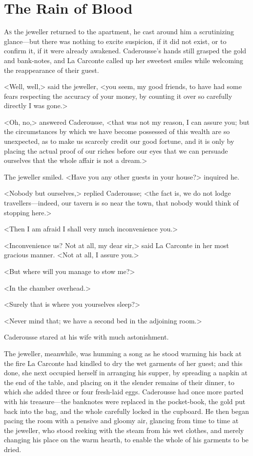 \chapter{The Rain of Blood} 

 \lettrine[ante=']{A}{s} the jeweller returned to the apartment, he cast around him a scrutinizing glance—but there was nothing to excite suspicion, if it did not exist, or to confirm it, if it were already awakened. Caderousse's hands still grasped the gold and bank-notes, and La Carconte called up her sweetest smiles while welcoming the reappearance of their guest. 

 <Well, well,> said the jeweller, <you seem, my good friends, to have had some fears respecting the accuracy of your money, by counting it over so carefully directly I was gone.> 

 <Oh, no,> answered Caderousse, <that was not my reason, I can assure you; but the circumstances by which we have become possessed of this wealth are so unexpected, as to make us scarcely credit our good fortune, and it is only by placing the actual proof of our riches before our eyes that we can persuade ourselves that the whole affair is not a dream.> 

 The jeweller smiled. <Have you any other guests in your house?> inquired he. 

 <Nobody but ourselves,> replied Caderousse; <the fact is, we do not lodge travellers—indeed, our tavern is so near the town, that nobody would think of stopping here.> 

 <Then I am afraid I shall very much inconvenience you.> 

 <Inconvenience us? Not at all, my dear sir,> said La Carconte in her most gracious manner. <Not at all, I assure you.> 

 <But where will you manage to stow me?> 

 <In the chamber overhead.> 

<Surely that is where you yourselves sleep?> 

 <Never mind that; we have a second bed in the adjoining room.> 

 Caderousse stared at his wife with much astonishment. 

 The jeweller, meanwhile, was humming a song as he stood warming his back at the fire La Carconte had kindled to dry the wet garments of her guest; and this done, she next occupied herself in arranging his supper, by spreading a napkin at the end of the table, and placing on it the slender remains of their dinner, to which she added three or four fresh-laid eggs. Caderousse had once more parted with his treasure—the banknotes were replaced in the pocket-book, the gold put back into the bag, and the whole carefully locked in the cupboard. He then began pacing the room with a pensive and gloomy air, glancing from time to time at the jeweller, who stood reeking with the steam from his wet clothes, and merely changing his place on the warm hearth, to enable the whole of his garments to be dried. 

